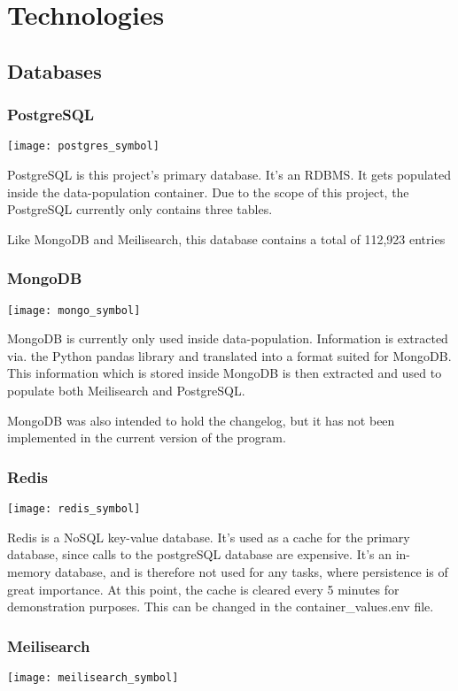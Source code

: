 \documentclass[a4paper, 12pt]{article}
\begin{document}
\section{Technologies}

\subsection{Databases}

\subsubsection{PostgreSQL}
\texttt{[image: postgres\_symbol]}

PostgreSQL is this project's primary database. It's an RDBMS. It gets populated inside the data-population container. Due to the scope of this project, the PostgreSQL currently only contains three tables. 

Like MongoDB and Meilisearch, this database contains a total of 112,923 entries

\subsubsection{MongoDB}
\texttt{[image: mongo\_symbol]}

MongoDB is currently only used inside data-population. Information is extracted via. the Python pandas library and translated into a format suited for MongoDB. This information which is stored inside MongoDB is then extracted and used to populate both Meilisearch and PostgreSQL.

MongoDB was also intended to hold the changelog, but it has not been implemented in the current version of the program.

\subsubsection{Redis}
\texttt{[image: redis\_symbol]}

Redis is a NoSQL key-value database. It's used as a cache for the primary database, since calls to the postgreSQL database are expensive. It's an in-memory database, and is therefore not used for any tasks, where persistence is of great importance. At this point, the cache is cleared every 5 minutes for demonstration purposes. This can be changed in the container\_values.env file.

\subsubsection{Meilisearch}
\texttt{[image: meilisearch\_symbol]}
\end{document}
